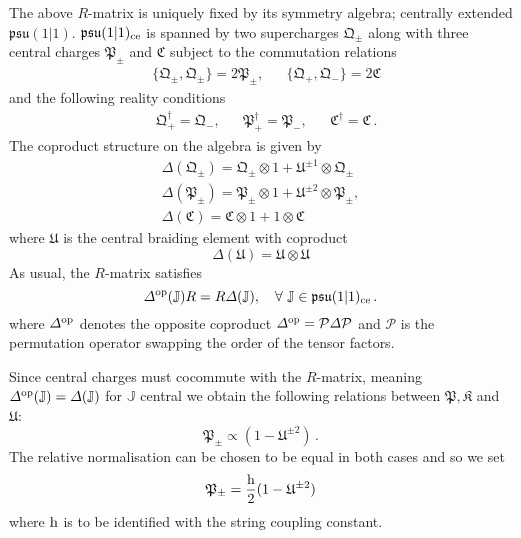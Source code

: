 \documentclass[12pt,a4paper]{article}
\numberwithin{equation}{section}
\newcommand{\psu}{\mathfrak{psu}}
\newcommand{\lP}{\mathcal{P}}
\begin{document}
The above $R$-matrix is uniquely fixed by its symmetry algebra; centrally extended  $\psu(1|1)$. $\psu(1|1)_{\rm ce}$ is spanned by two supercharges $\mathfrak{Q}_\pm$ along with three central charges $\mathfrak{P}_\pm$ and $\mathfrak{C}$ subject to the commutation relations 
\begin{align*}
&\{\mathfrak{Q}_\pm,\mathfrak{Q}_\pm \}=2\mathfrak{P}_\pm, 
&&\{\mathfrak{Q}_+,\mathfrak{Q}_-\}=2\mathfrak{C}
\end{align*}
and the following reality conditions 
\begin{align}
&\mathfrak{Q}_+^\dagger = \mathfrak{Q}_-,
 &&\mathfrak{P}_+^\dagger = \mathfrak{P}_-, 
 &&\mathfrak{C}^\dagger = \mathfrak{C}\,.
\end{align}
The coproduct structure on the algebra is given by 
\begin{equation}
\begin{array}{c}
\Delta(\mathfrak{Q}_\pm)=\mathfrak{Q}_\pm\otimes 1 + \mathfrak{U}^{\pm 1}\otimes \mathfrak{Q}_\pm \\
\Delta(\mathfrak{P}_\pm)=\mathfrak{P}_\pm\otimes 1 + \mathfrak{U}^{\pm 2}\otimes \mathfrak{P}_\pm, \\ \Delta(\mathfrak{C})=\mathfrak{C}\otimes 1 + 1\otimes \mathfrak{C}
\end{array}
\end{equation}
where $\mathfrak{U}$ is the central braiding element with coproduct
\begin{equation}
\Delta(\mathfrak{U})=\mathfrak{U}\otimes \mathfrak{U}
\end{equation}
%
As usual, the $R$-matrix satisfies 
\begin{equation}
\Delta^{\rm op}(\mathbb{J}) R = R \Delta(\mathbb{J}),\quad \forall\ \mathbb{J}\in \psu(1|1)_{\rm ce}\,.
\end{equation}
where $\Delta^{\rm op}$ denotes the opposite coproduct 
$\Delta^{\rm op} = \lP \Delta \lP$
and $\lP$ is the permutation operator swapping the order of the tensor factors. 


Since central charges must cocommute with the $R$-matrix, meaning $\Delta^{\rm op}(\mathbb{J})=\Delta(\mathbb{J})$ for $\mathbb{J}$ central we obtain the following relations between $\mathfrak{P},\mathfrak{K}$ and $\mathfrak{U}$:
\begin{equation}
\mathfrak{P}_\pm\propto (1-\mathfrak{U}^{\pm 2})\,.
\end{equation}
The relative normalisation can be chosen to be equal in both cases and so we set 
\begin{equation}
\mathfrak{P}_\pm=\frac{{\rm h}}{2} (1-\mathfrak{U}^{\pm 2})
\end{equation}
where ${\rm h}$ is to be identified with the string coupling constant. 
\end{document}
